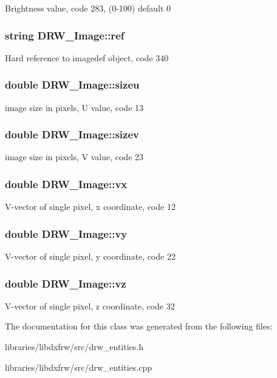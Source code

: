 Brightness value, code 283, (0-\/100) default 0 \hypertarget{classDRW__Image_a37432d187433c2214bb378bca78da43e}{
\subsubsection[{ref}]{\setlength{\rightskip}{0pt plus 5cm}string D\-R\-W\-\_\-\-Image\-::ref}}\label{classDRW__Image_a37432d187433c2214bb378bca78da43e}
Hard reference to imagedef object, code 340 \hypertarget{classDRW__Image_a99a8d4b8a7fb234f002b194d0e28d247}{
\subsubsection[{sizeu}]{\setlength{\rightskip}{0pt plus 5cm}double D\-R\-W\-\_\-\-Image\-::sizeu}}\label{classDRW__Image_a99a8d4b8a7fb234f002b194d0e28d247}
image size in pixels, U value, code 13 \hypertarget{classDRW__Image_ae2408c33253799a6e03ea1bfec4f84d7}{
\subsubsection[{sizev}]{\setlength{\rightskip}{0pt plus 5cm}double D\-R\-W\-\_\-\-Image\-::sizev}}\label{classDRW__Image_ae2408c33253799a6e03ea1bfec4f84d7}
image size in pixels, V value, code 23 \hypertarget{classDRW__Image_a1f7b4a2b11aed54038b1e978a8d99527}{
\subsubsection[{vx}]{\setlength{\rightskip}{0pt plus 5cm}double D\-R\-W\-\_\-\-Image\-::vx}}\label{classDRW__Image_a1f7b4a2b11aed54038b1e978a8d99527}
V-\/vector of single pixel, x coordinate, code 12 \hypertarget{classDRW__Image_a955bb709e5261c3f5b3ca99bfc5765d1}{
\subsubsection[{vy}]{\setlength{\rightskip}{0pt plus 5cm}double D\-R\-W\-\_\-\-Image\-::vy}}\label{classDRW__Image_a955bb709e5261c3f5b3ca99bfc5765d1}
V-\/vector of single pixel, y coordinate, code 22 \hypertarget{classDRW__Image_a075d00b1bc78bd275953d9730b0eaf8b}{
\subsubsection[{vz}]{\setlength{\rightskip}{0pt plus 5cm}double D\-R\-W\-\_\-\-Image\-::vz}}\label{classDRW__Image_a075d00b1bc78bd275953d9730b0eaf8b}
V-\/vector of single pixel, z coordinate, code 32 

The documentation for this class was generated from the following files\-:\begin{DoxyCompactItemize}
\item 
libraries/libdxfrw/src/drw\-\_\-entities.\-h\item 
libraries/libdxfrw/src/drw\-\_\-entities.\-cpp\end{DoxyCompactItemize}
